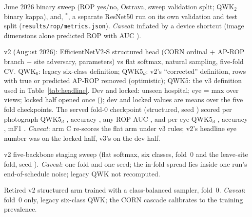 \documentclass[conference]{IEEEtran}
\begin{document}
\begin{table}[!t]
\caption{June 2026 binary sweep (ROP yes/no, Ostrava, sweep validation split; QWK$_2$ binary kappa), and, $^\ast$, a separate ResNet50 run on its own validation and test split (\texttt{results/rop/metrics.json}). \emph{Caveat}: inflated by a device shortcut (image dimensions alone predicted ROP with AUC \shortcutAUC{}).}
\label{tab:sweep}
\centering\scriptsize\setlength{\tabcolsep}{2.2pt}

\end{table}

\begin{table}[!t]
\caption{v2 (August 2026): EfficientNetV2-S structured head (CORN ordinal + AP-ROP branch + site adversary, \vtStructParams{} parameters) vs flat softmax, natural sampling, five-fold CV. QWK$_6$: legacy six-class definition; QWK5$_d$: v2's ``corrected'' definition, rows with true or predicted AP-ROP removed (optimistic); QWK5: the v3 definition used in Table~\ref{tab:headline}. Dev and locked: unseen hospital; eye = max over views; locked half opened once (\lockedOpened{}); dev and locked values are means over the five fold checkpoints. The served fold-0 checkpoint (structured, seed \seedA{}) scored per photograph QWK5$_d$ \vtServedImgQ{}, accuracy \vtServedImgAcc{}, any-ROP AUC \vtServedImgAUC{}, and per eye QWK5$_d$ \vtServedEyeQ{} \vtServedEyeQci{}, accuracy \vtServedEyeAcc{}, mF1 \vtServedEyeMF{}. \emph{Caveat}: arm C re-scores the flat arm under v3 rules; v2's headline eye number was on the locked half, v3's on the dev half.}
\label{tab:v2}
\centering\scriptsize\setlength{\tabcolsep}{3.4pt}

\end{table}

\begin{table}[!t]
\caption{v2 five-backbone staging sweep (flat softmax, six classes, fold~0 and the leave-site fold, seed \seedA{}). \emph{Caveat}: one fold and one seed; the in-fold spread lies inside one run's end-of-schedule noise; legacy QWK not recomputed.}
\label{tab:backbones}
\centering\scriptsize\setlength{\tabcolsep}{1.8pt}

\end{table}

\begin{table}[!t]
\caption{Retired v2 structured arm trained with a class-balanced sampler, fold~0. \emph{Caveat}: fold~0 only, legacy six-class QWK; the CORN cascade calibrates to the training prevalence.}
\label{tab:sampler}
\centering\scriptsize\setlength{\tabcolsep}{3pt}

\end{table}
\end{document}
